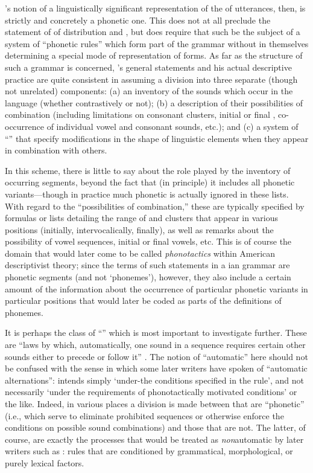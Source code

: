 {\Boas}'s notion of a linguistically significant representation of the
 of utterances, then, is strictly and concretely a
phonetic one. This does not at all preclude the statement of
 of distribution and , but does require that
such  be the subject of a system of ``phonetic rules'' which
form part of the grammar without in themselves determining a special
mode of representation of forms. As far as the structure of such a
grammar is concerned, {\Boas}'s general statements and his actual
descriptive practice are quite consistent in assuming a division into
three separate (though not unrelated) components: (a) an inventory of
the sounds which occur in the language (whether contrastively or not);
(b) a description of their possibilities of combination (including
limitations on consonant clusters, initial or final ,
co-occurrence of individual vowel and consonant sounds, etc.); and (c)
a system of ``'' that specify modifications in the shape of
linguistic elements when they appear in combination with others.

In this scheme, there is little to say about the role played by the
inventory of occurring segments, beyond the fact that (in principle)
it includes all phonetic variants—though in practice much phonetic
 is actually ignored in these lists. With regard to the
``possibilities of combination,'' these are typically specified by
formulas or lists detailing the range of  and clusters that
appear in various positions (initially, intervocalically, finally), as
well as remarks about the possibility of vowel sequences, initial or
final vowels, etc. This is of course the domain that would later come
to be called \emph{phonotactics} within American descriptivist theory;
since the terms of such statements in a {\Boas}ian grammar are phonetic
segments (and not `phonemes'), however, they also include a certain
amount of the information about the occurrence of particular phonetic
variants in particular positions that would later be coded as parts of
the definitions of phonemes.

It is perhaps the class of ``'' which is most important to
investigate further. These are ``laws by which, automatically, one
sound in a sequence requires certain other sounds either to precede or
follow it'' \citep[79]{boas11:introduction}. The notion of ``automatic''
here should not be confused with the sense in which some later writers
\citep[e.g.][]{wells49:automatic}
have spoken of ``automatic alternations'': {\Boas} intends simply
`under-the conditions specified in the rule', and not necessarily
`under the requirements of phonotactically motivated conditions' or
the like. Indeed, in various places a division is made between
 that are ``phonetic'' (i.e., which serve to eliminate
prohibited sequences or otherwise enforce the conditions on possible
sound combinations) and those that are not. The latter, of course, are
exactly the processes that would be treated as \emph{non}automatic by
later writers such as {\Wells}: rules that are
conditioned by grammatical, morphological, or purely lexical factors.

